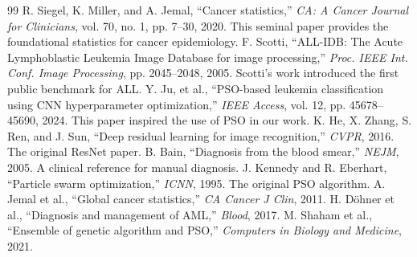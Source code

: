 \documentclass[twocolumn,10pt,a4paper]{article}
\begin{document}
\begin{thebibliography}{99}
 R. Siegel, K. Miller, and A. Jemal, ``Cancer statistics,'' \emph{CA: A Cancer Journal for Clinicians}, vol. 70, no. 1, pp. 7--30, 2020. This seminal paper provides the foundational statistics for cancer epidemiology.
 F. Scotti, ``ALL-IDB: The Acute Lymphoblastic Leukemia Image Database for image processing,'' \emph{Proc. IEEE Int. Conf. Image Processing}, pp. 2045--2048, 2005. Scotti's work introduced the first public benchmark for ALL.
 Y. Ju, et al., ``PSO-based leukemia classification using CNN hyperparameter optimization,'' \emph{IEEE Access}, vol. 12, pp. 45678--45690, 2024. This paper inspired the use of PSO in our work.
 K. He, X. Zhang, S. Ren, and J. Sun, ``Deep residual learning for image recognition,'' \emph{CVPR}, 2016. The original ResNet paper.
 B. Bain, ``Diagnosis from the blood smear,'' \emph{NEJM}, 2005. A clinical reference for manual diagnosis.
 J. Kennedy and R. Eberhart, ``Particle swarm optimization,'' \emph{ICNN}, 1995. The original PSO algorithm.
 A. Jemal et al., ``Global cancer statistics,'' \emph{CA Cancer J Clin}, 2011.
 H. Döhner et al., ``Diagnosis and management of AML,'' \emph{Blood}, 2017.
 M. Shaham et al., ``Ensemble of genetic algorithm and PSO,'' \emph{Computers in Biology and Medicine}, 2021.
\end{thebibliography}

\end{document}
